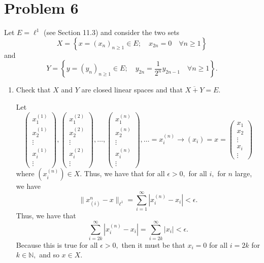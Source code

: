 \documentclass[11pt]{article}
\newcommand{\bbN}{\mathbb{N}}
\begin{document}
\begin{problem}
\begin{enumerate}
\begin{problem}
\end{problem}

\newpage
\section*{Problem 6}
\begin{problem}
Let $E = \ell^1$ (see Section 11.3) and consider the two sets
\[
X = \left\{ x = (x_n)_{n \geq 1} \in E; \quad x_{2n} = 0 \quad \forall n \geq 1 \right\}
\]
and
\[
Y = \left\{ y = (y_n)_{n \geq 1} \in E; \quad y_{2n} = \frac{1}{2^n} y_{2n-1} \quad \forall n \geq 1 \right\}.
\]

\begin{enumerate}
    \item Check that $X$ and $Y$ are closed linear spaces and that $\overline{X + Y} = E$.
\begin{solution}
    Let \[
    \begin{pmatrix}
        x_1^{(1)}\\
        x_2^{(1)}\\
        \vdots\\
        x_i^{(1)}\\
        \vdots
    \end{pmatrix}, 
    \begin{pmatrix}
        x_1^{(2)}\\
        x_2^{(2)}\\
        \vdots\\
        x_i^{(2)}\\
        \vdots
    \end{pmatrix},
    \dots,
    \begin{pmatrix}
        x_1^{(n)}\\
        x_2^{(n)}\\
        \vdots\\
        x_i^{(n)}\\
        \vdots
    \end{pmatrix},
    \dots =
    x^{(n)}_i \to (x_i) = x = \begin{pmatrix}
        x_1\\x_2\\\vdots\\ x_i \\\vdots
    \end{pmatrix}\] where $(x^{(n)}_i) \in X.$ Thus, we have that for all $\epsilon>0,$ for all $i,$ for $n$ large, we have
    \[\|x^{n}_{(i)} - x\|_{\ell^1} = \sum_{i=1}^\infty |x_i^{(n)} - x_i| < \epsilon.\] Thus, we have that 
    \[\sum_{i=2k}^\infty |x_i^{(n)} - x_i|  = \sum_{i=2k}^\infty |x_i| < \epsilon.\] Because this is true for all $\epsilon >0,$ then it must be that $x_i = 0$ for all $i = 2k$ for $k\in \bbN,$ and so $x\in X.$


\end{solution}
\end{enumerate}
\end{problem}
\end{enumerate}
\end{problem}
\end{document}
